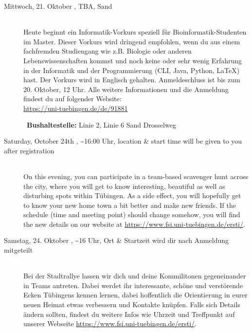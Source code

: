 \begin{description}
\fi

\ifmaster
    \ifbinfo
        \item[Mittwoch, 21. Oktober \YEAR, TBA, Sand]\ \\
            Heute beginnt ein Informatik-Vorkurs speziell für Bioinformatik-Studenten im Master. Dieser Vorkurs wird dringend empfohlen, wenn du aus einem fachfremden Studiengang wie z.B. Biologie oder anderen Lebenswissenschaften kommst und noch keine oder sehr wenig Erfahrung in der Informatik und der Programmierung (CLI, Java, Python, \LaTeX) hast. Der Vorkurs wird in Englisch gehalten. Anmeldeschluss ist bis zum 20. Oktober, 12 Uhr. Alle weitere Informationen und die Anmeldung findest du auf folgender Website: \\ \url{https://uni-tuebingen.de/de/91881}

        ~\textbf{Bushaltestelle:} Linie 2, Linie 6 Sand Drosselweg
    \fi
\fi

\ifml
	\item[Saturday, October 24th \YEAR, \textasciitilde 16:00 Uhr, \footnotesize{location \& start time will be given to you after registration}]\ \\
	On this evening, you can participate in a team-based scavenger hunt across the city, where you will get to know interesting, beautiful as well as disturbing spots within Tübingen. As a side effect, you will hopefully get to know your new home town a bit better and make new friends.
	If the schedule (time and meeting point) should change somehow, you will find the new details on our website at \url{https://www.fsi.uni-tuebingen.de/ersti/}.

\else
	 \item[Samstag, 24. Oktober \YEAR, \textasciitilde 16 Uhr, \footnotesize{Ort \& Startzeit wird dir nach Anmeldung mitgeteilt}]\ \\
	 Bei der Stadtrallye lassen wir dich und deine Kommilitonen gegeneinander in Teams antreten. Dabei werdet ihr interessante, schöne und verstörende Ecken Tübingens kennen lernen, dabei hoffentlich die Orientierung in eurer neuen Heimat etwas verbessern und Kontakte knüpfen.
	 Falls sich Details ändern sollten, findest du weitere Infos wie Uhrzeit und Treffpunkt auf unserer Webseite \url{https://www.fsi.uni-tuebingen.de/ersti/}.
\fi


\end{description}

